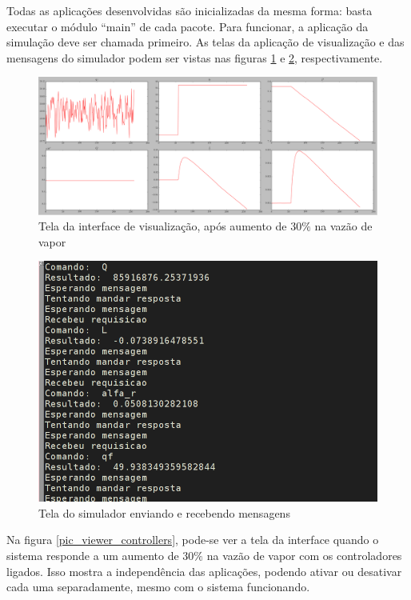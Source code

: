 

Todas as aplicações desenvolvidas são inicializadas da mesma forma:
basta executar o módulo ``main'' de cada pacote. Para funcionar, a
aplicação da simulação deve ser chamada primeiro. As telas da
aplicação de visualização e das mensagens do simulador podem ser
vistas nas figuras \ref{pic_viewer} e \ref{pic_sim}, respectivamente.

\begin{figure}[H]
  \caption{\label{pic_viewer} Tela da interface de visualização, após
    aumento de $30\%$ na vazão de vapor}
  \centering
  \includegraphics[scale=0.25]{img/pic_viewer.png}
\end{figure}

\begin{figure}[H]
  \caption{\label{pic_sim} Tela do simulador enviando e recebendo
    mensagens}
  \begin{center}
    \includegraphics[scale=0.3]{img/pic_sim.png}
  \end{center}
\end{figure}

Na figura \ref{pic_viewer_controllers}, pode-se ver a tela da
interface quando o sistema responde a um aumento de $30\%$ na vazão de
vapor com os controladores ligados. Isso mostra a independência das
aplicações, podendo ativar ou desativar cada uma separadamente, mesmo
com o sistema funcionando.

